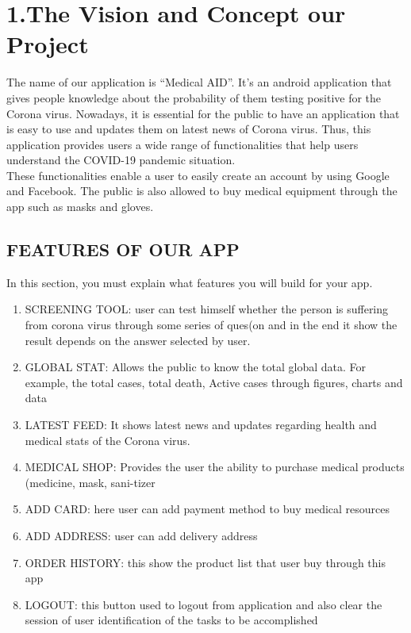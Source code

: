 \section *{\LARGE 1.The Vision and Concept our Project}

The name of our application is “Medical AID”. It’s an android application that gives people knowledge about the probability of them testing positive for the Corona virus. Nowadays, it is essential for the public to have an application that is easy to use and updates them on latest news of Corona virus. Thus, this application provides users a wide range of functionalities that help users understand the COVID-19 pandemic situation.
\\
These functionalities enable a user to easily create an account by using Google and Facebook. The public is also allowed to buy medical equipment through the app such as masks and gloves. 

\subsection{FEATURES OF OUR APP}
In this section, you must explain what features you will build for your app.
\begin{enumerate}
    \item SCREENING TOOL: user can test himself whether the person is suffering from corona virus through some series of ques(on and in the end it show the result depends on the answer selected by user.
    \item GLOBAL STAT: Allows the public to know the total global data. For example, the total cases, total death, Active cases through figures, charts and data
    \item LATEST FEED: It shows latest news and updates regarding health and medical stats of the Corona virus.
    \item MEDICAL SHOP: Provides the user the ability to purchase medical products (medicine, mask, sani-tizer
    \item ADD CARD: here user can add payment method to buy medical resources
    \item ADD ADDRESS: user can add delivery address
    \item ORDER HISTORY: this show the product list that user buy through this app
    \item LOGOUT: this button used to logout from application and also clear the session of user identification of the tasks to be accomplished
\end{enumerate}
